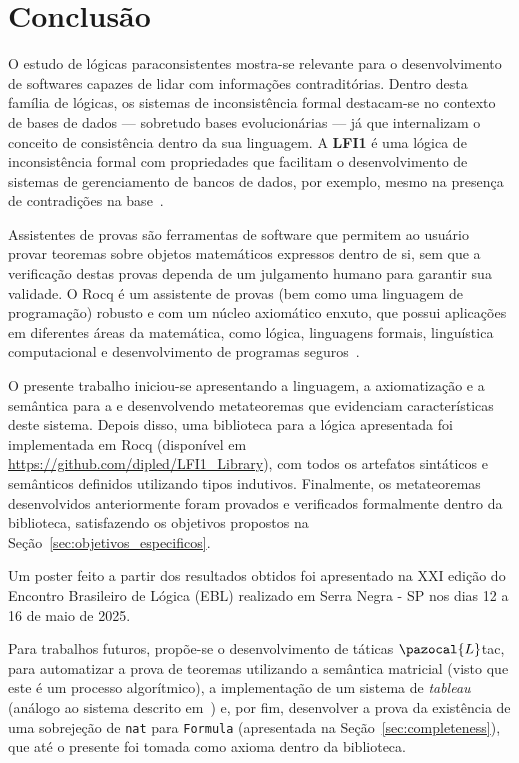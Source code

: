 \chapter{Conclusão}\label{chap:conclusao}

O estudo de lógicas paraconsistentes mostra-se relevante para o desenvolvimento de softwares capazes de lidar com informações contraditórias. Dentro desta família de lógicas, os sistemas de inconsistência formal destacam-se no contexto de bases de dados {---} sobretudo bases evolucionárias {---} já que internalizam o conceito de consistência dentro da sua linguagem. A \textbf{LFI1} é uma lógica de inconsistência formal com propriedades que facilitam o desenvolvimento de sistemas de gerenciamento de bancos de dados, por exemplo, mesmo na presença de contradições na base~\cite{carnielli2000formal}.

Assistentes de provas são ferramentas de software que permitem ao usuário provar teoremas sobre objetos matemáticos expressos dentro de si, sem que a verificação destas provas dependa de um julgamento humano para garantir sua validade. O Rocq é um assistente de provas (bem como uma linguagem de programação) robusto e com um núcleo axiomático enxuto, que possui aplicações em diferentes áreas da matemática, como lógica, linguagens formais, linguística computacional e desenvolvimento de programas seguros~\cite{coqart}.

O presente trabalho iniciou-se apresentando a linguagem, a axiomatização e a semântica para a \lfium{} e desenvolvendo metateoremas que evidenciam características deste sistema. Depois disso, uma biblioteca para a lógica apresentada foi implementada em Rocq (disponível em \url{https://github.com/dipled/LFI1_Library}), com todos os artefatos sintáticos e semânticos definidos utilizando tipos indutivos. Finalmente, os metateoremas desenvolvidos anteriormente foram provados e verificados formalmente dentro da biblioteca, satisfazendo os objetivos propostos na Seção~\ref{sec:objetivos_especificos}.

Um poster feito a partir dos resultados obtidos foi apresentado na XXI edição do Encontro Brasileiro de Lógica (EBL) realizado em Serra Negra {-} SP nos dias 12 a 16 de maio de 2025.

Para trabalhos futuros, propõe-se o desenvolvimento de táticas $\pazocal{L}$tac, para automatizar a prova de teoremas utilizando a semântica matricial (visto que este é um processo algorítmico), a implementação de um sistema de \textit{tableau} (análogo ao sistema descrito em~\cite{tableaulfi}) e, por fim, desenvolver a prova da existência de uma sobrejeção de \texttt{nat} para \texttt{Formula} (apresentada na Seção~\ref{sec:completeness}), que até o presente foi tomada como axioma dentro da biblioteca.